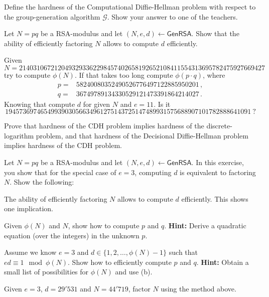 \documentclass[a4paper,10pt,landscape,twocolumn]{scrartcl}
\begin{document}
\begin{exercise}
Define the hardness of the Computational Diffie-Hellman problem with respect to the group-generation algorithm $\mathcal{G}$. Show your answer to one of the teachers.
\end{exercise}

\begin{exercise}[RSA]
Let $N=pq$ be a RSA-modulus and let
  $(N,e,d) \leftarrow \mathsf{GenRSA}$. 
Show that the ability of efficiently factoring $N$ allows to compute $d$
  efficiently.
  
  Given 
  \begin{equation*}
  N=2140310672120493293362298457402658192652108411554313695782475927669427
  \end{equation*}
  try to compute $\phi(N)$. If that takes too long compute $\phi(p\cdot q)$, where 
  \begin{align*}
  p=&58240080352490526776497122885950201 \, ,\\
  q=&36749789134330529121473391864214027 \, .
  \end{align*}
  Knowing that compute $d$ for given $N$ and $e=11$. Is it 
  \begin{equation*}
  1945736974654993903056634961275143725147489931575688907101782888641091 \  ?
  \end{equation*}
\end{exercise}

\begin{bonusexercise}
Prove that hardness of the CDH problem implies hardness of the discrete-logarithm problem, and that hardness of the Decisional Diffie-Hellman problem implies hardness of the CDH problem.
\end{bonusexercise}

\begin{bonusexercise}
Let $N=pq$ be a RSA-modulus and let
 $(N,e,d) \leftarrow \mathsf{GenRSA}$. In this exercise, you show
 that for the special case of $e=3$, computing $d$ is equivalent to
 factoring $N$. Show the following:
\begin{subex}
The ability of efficiently factoring $N$ allows to compute $d$
 efficiently. This shows one implication.
\end{subex}

\begin{subex}
Given $\phi(N)$ and $N$, show how to compute $p$ and $q$. 
\textbf{Hint:} Derive a quadratic equation (over the integers) in the
   unknown $p$.
\end{subex}
 
\begin{subex}
Assume we know $e=3$ and $d \in \{1,2,\ldots,\phi(N)-1\}$ such
   that $ed \equiv 1 \mod \phi(N)$. Show how to efficiently compute
   $p$ and $q$. \textbf{Hint:} Obtain a small list of possibilities for
   $\phi(N)$ and use (b).
\end{subex}

\begin{subex} 
Given $e=3$, $d=29'531$ and $N=44'719$, factor $N$ using the
 method above.
\end{subex}
\end{bonusexercise}
\end{document}
